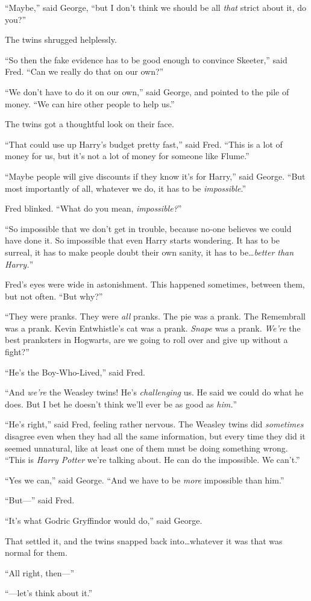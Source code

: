 “Maybe,” said George, “but I don’t think we should be all \emph{that} strict about it, do you?”

The twins shrugged helplessly.

“So then the fake evidence has to be good enough to convince Skeeter,” said Fred. “Can we really do that on our own?”

“We don’t have to do it on our own,” said George, and pointed to the pile of money. “We can hire other people to help us.”

The twins got a thoughtful look on their face.

“That could use up Harry’s budget pretty fast,” said Fred. “This is a lot of money for us, but it’s not a lot of money for someone like Flume.”

“Maybe people will give discounts if they know it’s for Harry,” said George. “But most importantly of all, whatever we do, it has to be \emph{impossible}.”

Fred blinked. “What do you mean, \emph{impossible?}”

“So impossible that we don’t get in trouble, because no-one believes we could have done it. So impossible that even Harry starts wondering. It has to be surreal, it has to make people doubt their own sanity, it has to be…\emph{better than Harry.}”

Fred’s eyes were wide in astonishment. This happened sometimes, between them, but not often. “But why?”

“They were pranks. They were \emph{all} pranks. The pie was a prank. The Remembrall was a prank. Kevin Entwhistle’s cat was a prank. \emph{Snape} was a prank. \emph{We’re} the best pranksters in Hogwarts, are we going to roll over and give up without a fight?”

“He’s the Boy-Who-Lived,” said Fred.

“And \emph{we’re} the Weasley twins! He’s \emph{challenging} us. He said we could do what he does. But I bet he doesn’t think we’ll ever be as good as \emph{him.}”

“He’s right,” said Fred, feeling rather nervous. The Weasley twins did \emph{sometimes} disagree even when they had all the same information, but every time they did it seemed unnatural, like at least one of them must be doing something wrong. “This is \emph{Harry Potter} we’re talking about. He can do the impossible. We can’t.”

“Yes we can,” said George. “And we have to be \emph{more} impossible than him.”

“But—” said Fred.

“It’s what Godric Gryffindor would do,” said George.

That settled it, and the twins snapped back into…whatever it was that was normal for them.

“All right, then—”

“—let’s think about it.”

